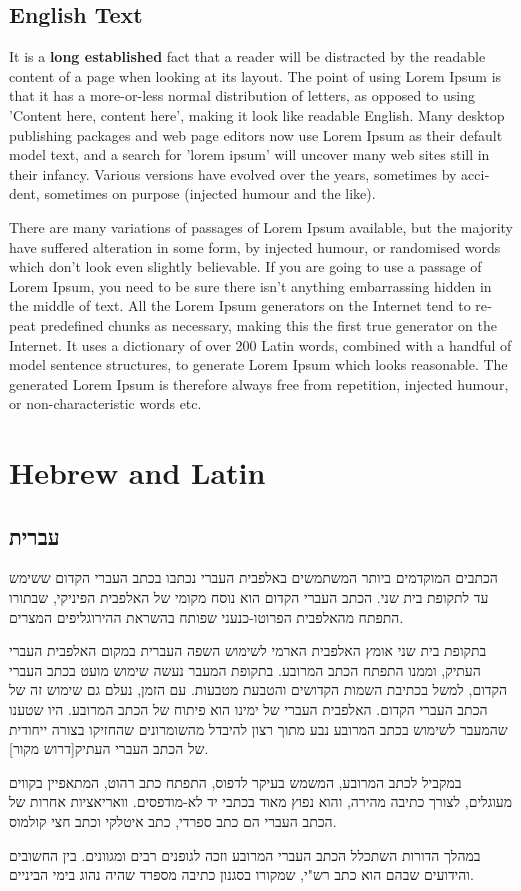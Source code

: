 \documentclass[11pt,pdfa,ja]{MishoText}
\begin{document}
\begin{english}
\section{English Text}
It is a \textbf{long established} fact that a reader will be distracted by the readable content of a page when looking at its layout. The point of using Lorem Ipsum is that it has a more-or-less normal distribution of letters, as opposed to using 'Content here, content here', making it look like readable English. Many desktop publishing packages and web page editors now use Lorem Ipsum as their default model text, and a search for 'lorem ipsum' will uncover many web sites still in their infancy. Various versions have evolved over the years, sometimes by accident, sometimes on purpose (injected humour and the like).

There are many variations of passages of Lorem Ipsum available, but the majority have suffered alteration in some form, by injected humour, or randomised words which don't look even slightly believable. If you are going to use a passage of Lorem Ipsum, you need to be sure there isn't anything embarrassing hidden in the middle of text. All the Lorem Ipsum generators on the Internet tend to repeat predefined chunks as necessary, making this the first true generator on the Internet. It uses a dictionary of over 200 Latin words, combined with a handful of model sentence structures, to generate Lorem Ipsum which looks reasonable. The generated Lorem Ipsum is therefore always free from repetition, injected humour, or non-characteristic words etc.
\end{english}

\chapter{Hebrew and Latin}
\begin{hebrew}
\section{עברית}
הכתבים המוקדמים ביותר המשתמשים באלפבית העברי נכתבו בכתב העברי הקדום ששימש עד לתקופת בית שני. הכתב העברי הקדום הוא נוסח מקומי של האלפבית הפיניקי, שבתורו התפתח מהאלפבית הפרוטו-כנעני שפותח בהשראת ההירוגליפים המצרים.

בתקופת בית שני אומץ האלפבית הארמי לשימוש השפה העברית במקום האלפבית העברי העתיק, וממנו התפתח הכתב המרובע. בתקופת המעבר נעשה שימוש מועט בכתב העברי הקדום, למשל בכתיבת השמות הקדושים והטבעת מטבעות. עם הזמן, נעלם גם שימוש זה של הכתב העברי הקדום. האלפבית העברי של ימינו הוא פיתוח של הכתב המרובע. היו שטענו שהמעבר לשימוש בכתב המרובע נבע מתוך רצון להיבדל מהשומרונים שהחזיקו בצורה ייחודית של הכתב העברי העתיק[דרוש מקור].

במקביל לכתב המרובע, המשמש בעיקר לדפוס, התפתח כתב רהוט, המתאפיין בקווים מעוגלים, לצורך כתיבה מהירה, והוא נפוץ מאוד בכתבי יד לא-מודפסים. וואריאציות אחרות של הכתב העברי הם כתב ספרדי, כתב איטלקי וכתב חצי קולמוס.

במהלך הדורות השתכלל הכתב העברי המרובע וזכה לגופנים רבים ומגוונים. בין החשובים והידועים שבהם הוא כתב רש"י, שמקורו בסגנון כתיבה מספרד שהיה נהוג בימי הביניים. 
\end{hebrew}

\lipsum[1]
\end{document}
